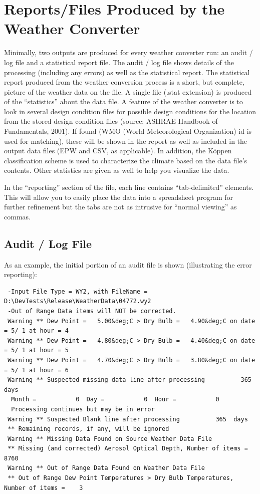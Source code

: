 \section{Reports/Files Produced by the Weather Converter}\label{reportsfiles-produced-by-the-weather-converter}

Minimally, two outputs are produced for every weather converter run: an audit / log file and a statistical report file. The audit / log file shows details of the processing (including any errors) as well as the statistical report. The statistical report produced from the weather conversion process is a short, but complete, picture of the weather data on the file. A single file (.stat extension) is produced of the ``statistics'' about the data file. A feature of the weather converter is to look in several design condition files for possible design conditions for the location from the stored design condition files (source: ASHRAE Handbook of Fundamentals, 2001). If found (WMO (World Meteorological Organization) id is used for matching), these will be shown in the report as well as included in the output data files (EPW and CSV, as applicable). In addition, the Köppen classification scheme is used to characterize the climate based on the data file's contents. Other statistics are given as well to help you visualize the data.

In the ``reporting'' section of the file, each line contains ``tab-delimited'' elements. This will allow you to easily place the data into a spreadsheet program for further refinement but the tabs are not as intrusive for ``normal viewing'' as commas.

\subsection{Audit / Log File}\label{audit-log-file}

As an example, the initial portion of an audit file is shown (illustrating the error reporting):

\begin{lstlisting}
 -Input File Type = WY2, with FileName = D:\DevTests\Release\WeatherData\04772.wy2
 -Out of Range Data items will NOT be corrected.
 Warning ** Dew Point =   5.00&deg;C > Dry Bulb =   4.90&deg;C on date = 5/ 1 at hour = 4
 Warning ** Dew Point =   4.80&deg;C > Dry Bulb =   4.40&deg;C on date = 5/ 1 at hour = 5
 Warning ** Dew Point =   4.70&deg;C > Dry Bulb =   3.80&deg;C on date = 5/ 1 at hour = 6
 Warning ** Suspected missing data line after processing          365  days
  Month =           0  Day =           0  Hour =           0
  Processing continues but may be in error
 Warning ** Suspected Blank line after processing          365  days
 ** Remaining records, if any, will be ignored
 Warning ** Missing Data Found on Source Weather Data File
 ** Missing (and corrected) Aerosol Optical Depth, Number of items = 8760
 Warning ** Out of Range Data Found on Weather Data File
 ** Out of Range Dew Point Temperatures > Dry Bulb Temperatures, Number of items =    3
\end{lstlisting}


